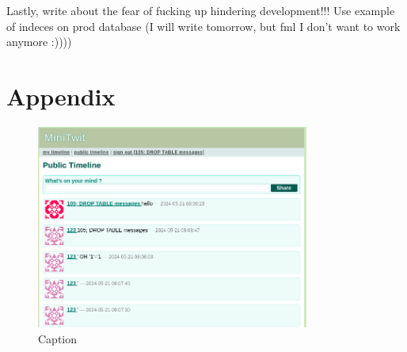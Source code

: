 \documentclass[11pt]{article}
\begin{document}
Lastly, write about the fear of fucking up hindering development!!! Use example of indeces on prod database (I will write tomorrow, but fml I don't want to work anymore :))))









 


\newpage




\section{Appendix}
\begin{figure}
    \centering
    \includegraphics[width=0.8\textwidth]{images/sql_injections.png}
    \caption{Caption}
    \label{fig:sqlinjections}
\end{figure}
\end{document}

